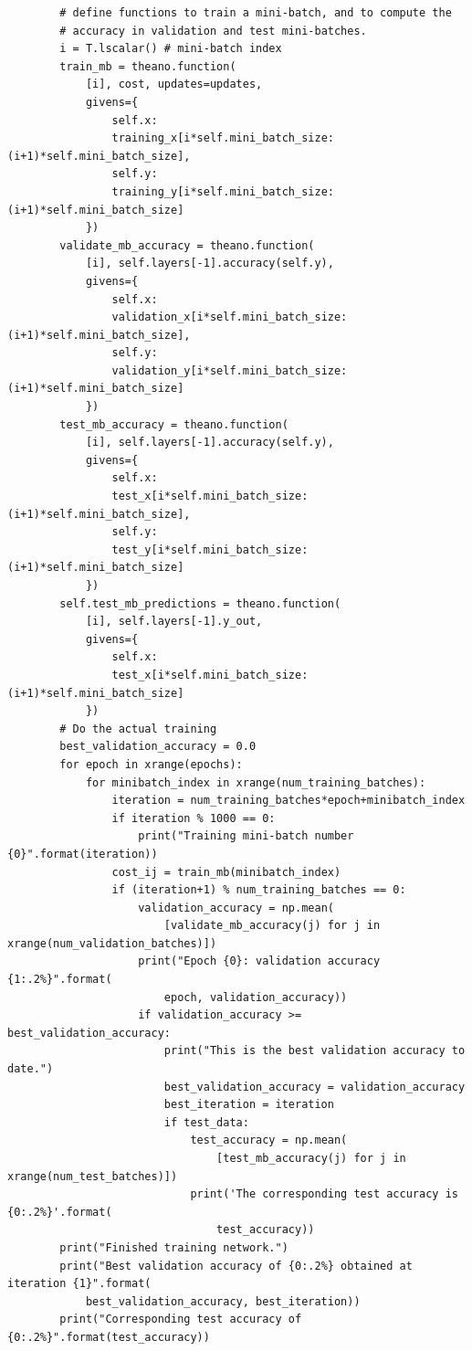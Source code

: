 \documentclass[a4paper,twoside,10pt]{book}
\begin{document}
\begin{lstlisting}
        # define functions to train a mini-batch, and to compute the
        # accuracy in validation and test mini-batches.
        i = T.lscalar() # mini-batch index
        train_mb = theano.function(
            [i], cost, updates=updates,
            givens={
                self.x:
                training_x[i*self.mini_batch_size: (i+1)*self.mini_batch_size],
                self.y:
                training_y[i*self.mini_batch_size: (i+1)*self.mini_batch_size]
            })
        validate_mb_accuracy = theano.function(
            [i], self.layers[-1].accuracy(self.y),
            givens={
                self.x:
                validation_x[i*self.mini_batch_size: (i+1)*self.mini_batch_size],
                self.y:
                validation_y[i*self.mini_batch_size: (i+1)*self.mini_batch_size]
            })
        test_mb_accuracy = theano.function(
            [i], self.layers[-1].accuracy(self.y),
            givens={
                self.x:
                test_x[i*self.mini_batch_size: (i+1)*self.mini_batch_size],
                self.y:
                test_y[i*self.mini_batch_size: (i+1)*self.mini_batch_size]
            })
        self.test_mb_predictions = theano.function(
            [i], self.layers[-1].y_out,
            givens={
                self.x:
                test_x[i*self.mini_batch_size: (i+1)*self.mini_batch_size]
            })
        # Do the actual training
        best_validation_accuracy = 0.0
        for epoch in xrange(epochs):
            for minibatch_index in xrange(num_training_batches):
                iteration = num_training_batches*epoch+minibatch_index
                if iteration % 1000 == 0:
                    print("Training mini-batch number {0}".format(iteration))
                cost_ij = train_mb(minibatch_index)
                if (iteration+1) % num_training_batches == 0:
                    validation_accuracy = np.mean(
                        [validate_mb_accuracy(j) for j in xrange(num_validation_batches)])
                    print("Epoch {0}: validation accuracy {1:.2%}".format(
                        epoch, validation_accuracy))
                    if validation_accuracy >= best_validation_accuracy:
                        print("This is the best validation accuracy to date.")
                        best_validation_accuracy = validation_accuracy
                        best_iteration = iteration
                        if test_data:
                            test_accuracy = np.mean(
                                [test_mb_accuracy(j) for j in xrange(num_test_batches)])
                            print('The corresponding test accuracy is {0:.2%}'.format(
                                test_accuracy))
        print("Finished training network.")
        print("Best validation accuracy of {0:.2%} obtained at iteration {1}".format(
            best_validation_accuracy, best_iteration))
        print("Corresponding test accuracy of {0:.2%}".format(test_accuracy))


\end{lstlisting}
\end{document}
